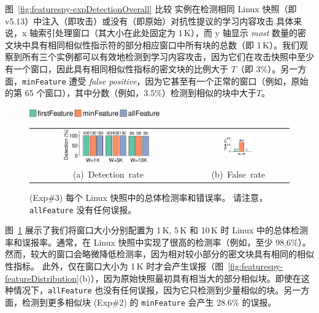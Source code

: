   图~\ref{fig:featurespy-expDetectionOverall} 比较 \sysnameF 实例在检测相同 Linux 快照（即 v5.13）中注入（即攻击）或没有（即原始）对抗性提议的学习内容攻击.具体来说，x 轴索引处理窗口（其大小在此处固定为 1\,K），而 y 轴显示 {\em most} 数量的密文块中具有相同相似性指示符的部分相应窗口中所有块的总数（即 1\,K）。我们观察到所有三个实例都可以有效地检测到学习内容攻击，因为它们在攻击快照中至少有一个窗口，因此具有相同相似性指标的密文块的比例大于 $T $（即 3\%）。另一方面，{\tt minFeature} 遭受 {\em false positive}，因为它甚至有一个正常的窗口（例如，原始的第 65 个窗口），其中分数（例如，3.5\%）检测到相似的块中大于$T$。


\begin{figure}[t]
    \centering
    \includegraphics[width=0.5\textwidth]{pic/featurespy/plot/detection/overall/effectiveness-falsePositive_legend.pdf}
    \vspace{5pt}\\
    \begin{tabular}{@{\ }c@{\ }c}
        \includegraphics[width=0.6\textwidth]{pic/featurespy/plot/detection/overall/effectivenessLinux.pdf} &
        \includegraphics[width=0.3\textwidth]{pic/featurespy/plot/detection/overall/falsePositiveLinux.pdf}\\
        \mbox{\small (a) Detection rate} &
        \mbox{\small (b) False rate}\\
    \end{tabular}
    \vspace{-6pt}
    \caption{(Exp\#3) 每个 Linux 快照中的总体检测率和错误率。 请注意，{\tt allFeature} 没有任何误报。}
    \vspace{-6pt}
    \label{fig:featurespy-expDetectionOverallFalsePositive}
\end{figure}

图~\ref{fig:featurespy-expDetectionOverallFalsePositive} 展示了我们将窗口大小分别配置为 1\,K, 5\,K 和 10\,K 时 Linux 中的总体检测率和误报率。通常，\sysnameF 在 Linux 快照中实现了很高的检测率（例如，至少 98.6\%）。然而，较大的窗口会略微降低检测率，因为相对较小部分的密文块具有相同的相似性指标。
此外，\sysnameF 仅在窗口大小为 1\,K 时才会产生误报（图~\ref{fig:featurespy-featureDistribution}(b)），因为原始快照最初具有相当大的部分相似块。即使在这种情况下，{\tt allFeature} 也没有任何误报，因为它只检测到少量相似的块。另一方面，检测到更多相似块 (Exp\#2) 的 {\tt minFeature} 会产生 28.6\% 的误报。


